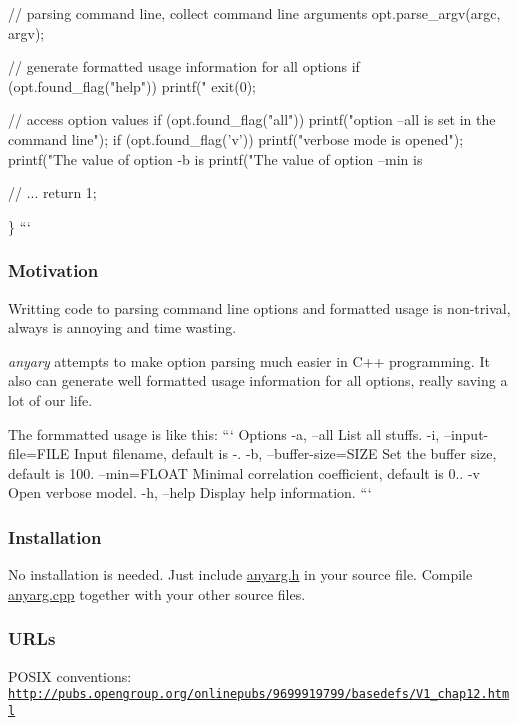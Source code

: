 \begin{DoxyVerb}// parsing command line, collect command line arguments
opt.parse_argv(argc, argv);

// generate formatted usage information for all options
if (opt.found_flag("help")) {
    printf("%
    exit(0);
}

// access option values
if (opt.found_flag("all"))
    printf("option --all is set in the command line\n");
if (opt.found_flag('v'))
    printf("verbose mode is opened\n");
printf("The value of option -b is %
printf("The value of option --min is %

// ...
return 1;
\end{DoxyVerb}
 \} ```

\subsubsection*{Motivation}

Writting code to parsing command line options and formatted usage is non-\/trival, always is annoying and time wasting.

{\itshape anyary} attempts to make option parsing much easier in C++ programming. It also can generate well formatted usage information for all options, really saving a lot of our life.

The formmatted usage is like this\+: ``` Options -\/a, --all List all stuffs. -\/i, --input-\/file=F\+I\+L\+E Input filename, default is -\/. -\/b, --buffer-\/size=S\+I\+Z\+E Set the buffer size, default is 100. --min=F\+L\+O\+A\+T Minimal correlation coefficient, default is 0.. -\/v Open verbose model. -\/h, --help Display help information. ```

\subsubsection*{Installation}

No installation is needed. Just include \hyperlink{anyarg_8h}{anyarg.\+h} in your source file. Compile \hyperlink{anyarg_8cpp}{anyarg.\+cpp} together with your other source files.

\subsubsection*{U\+R\+Ls}

P\+O\+S\+I\+X conventions\+: \href{http://pubs.opengroup.org/onlinepubs/9699919799/basedefs/V1_chap12.html}{\tt http\+://pubs.\+opengroup.\+org/onlinepubs/9699919799/basedefs/\+V1\+\_\+chap12.\+html}

